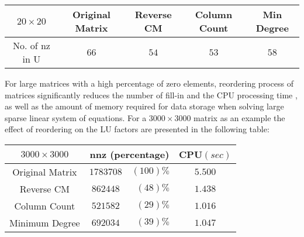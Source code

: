   \vskip 10pt
  \noindent
  \begin{center}
      \begin{tabular}{c|cccc}
          $20 \times 20$ & Original Matrix & Reverse CM & Column Count & Min Degree  \\ \hline
          No. of nz in U &$ 66 $           & $ 54 $      & $ 53 $        &$ 58 $  \\
      \end{tabular}
  \end{center}
  \vskip 10pt
  \noindent
  
  For large matrices with a high percentage of zero elements, reordering process
  of matrices significantly reduces the number of fill-in and the CPU processing
  time , as well as the amount of memory required for data storage when solving
  large sparse linear system of equations.
  \vskip 10pt
  \noindent
  For a $3000\times 3000$ matrix as an example the effect of reordering on the LU
  factors are presented in the following table:
  
  \vskip 10pt
  \noindent
  \begin{center}
    \begin{tabular}{c|cr|c}
      $3000 \times 3000$ & \multicolumn{2}{c|}{nnz (percentage)} &  CPU$(sec)$ \\ \hline
      Original Matrix    &$ 1783708$ &$(100)\%$& $5.500$ \\
      Reverse CM         &$ 862448$  &$(48)\% $& $1.438$ \\
      Column Count       &$ 521582$  &$(29)\% $& $1.016$ \\
      Minimum Degree     &$ 692034$  &$(39)\% $& $1.047$ \\
    \end{tabular}
  \end{center}
  \vskip 5pt
  \noindent
  

